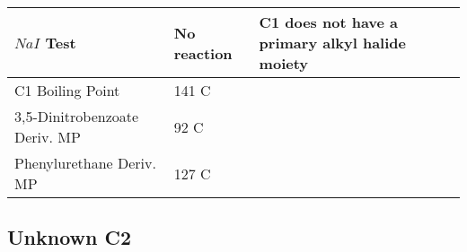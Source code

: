 \documentclass[11pt]{article}
\begin{document}
\begin{table}[h]
\begin{tabular}{ l  p{3.0cm} p{5.4cm} }
			$NaI$ Test & No reaction & C1 does not have a primary alkyl halide moiety \\\hline 
			
			C1 Boiling Point & 141 C &  \\\hline
			
			3,5-Dinitrobenzoate Deriv. MP & 92 C &  \\\hline 
			
			Phenylurethane Deriv. MP & 127 C &  \\\hline 
			
			
			
		\end{tabular}
	\end{table}
	\pagebreak
	
	\subsection{Unknown C2}
\end{document}
